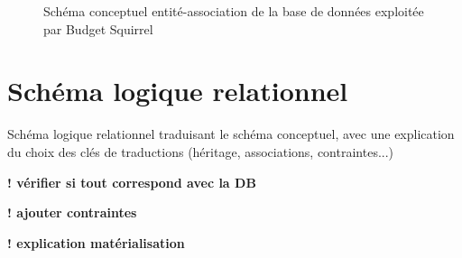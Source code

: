 \documentclass[a4paper,12pt]{article}
\begin{document}
\begin{figure}[!ht]
\noindent
{}
\caption{\footnotesize{Schéma conceptuel entité-association de la base de données exploitée par Budget Squirrel}}
\end{figure}




\newpage 

\section{Schéma logique relationnel}

Schéma logique relationnel traduisant le schéma conceptuel, avec une explication du choix des clés de traductions (héritage, associations, contraintes...)

\textbf{! vérifier si tout correspond avec la DB}

\textbf{! ajouter contraintes}

\textbf{!  explication matérialisation}
\end{document}

